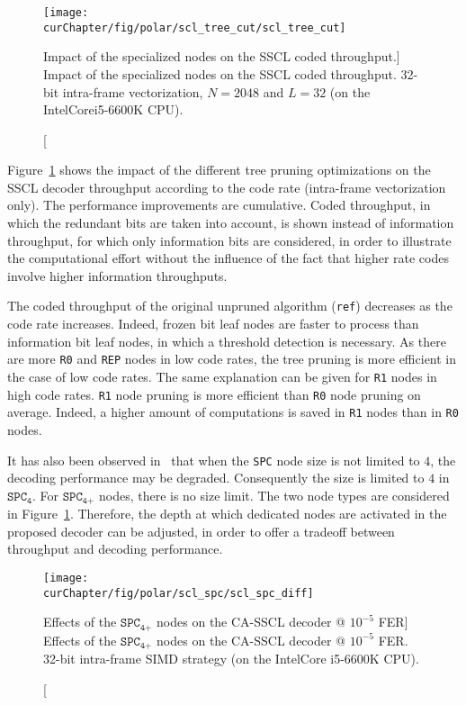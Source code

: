 \begin{figure}[htp]
  \centering
  \texttt{[image: \\curChapter/fig/polar/scl\_tree\_cut/scl\_tree\_cut]}
  \caption
    [Impact of the specialized nodes on the SSCL coded throughput.]
    {Impact of the specialized nodes on the SSCL coded throughput.
    32-bit intra-frame vectorization, $N=2048$ and $L=32$
    (on the Intel\R Core\TM i5-6600K CPU).}
  \label{plot:opt_polar_scl_tree_cut}
\end{figure}

Figure~\ref{plot:opt_polar_scl_tree_cut} shows the impact of the different tree
pruning optimizations on the SSCL decoder throughput according to the code
rate (intra-frame vectorization only). The performance improvements are
cumulative. Coded throughput, in which the redundant bits are taken into
account, is shown instead of information throughput, for which only information
bits are considered, in order to illustrate the computational effort without the
influence of the fact that higher rate codes involve higher information
throughputs.

The coded throughput of the original unpruned algorithm (\verb|ref|) decreases
as the code rate increases. Indeed, frozen bit leaf nodes are faster to process
than information bit leaf nodes, in which a threshold detection is necessary. As
there are more \verb|R0| and \verb|REP| nodes in low code rates, the tree
pruning is more efficient in the case of low code rates. The same explanation
can be given for \verb|R1| nodes in high code rates. \verb|R1| node pruning is
more efficient than \verb|R0| node pruning on average. Indeed, a higher amount
of computations is saved in \verb|R1| nodes than in \verb|R0| nodes.

It has also been observed in~\cite{Sarkis2016} that when the \verb|SPC| node
size is not limited to $4$, the decoding performance may be degraded.
Consequently the size is limited to $4$ in $\texttt{SPC}_\texttt{4}$. For
$\texttt{SPC}_\texttt{4+}$ nodes, there is no size limit. The two node types are
considered in Figure~\ref{plot:opt_polar_scl_tree_cut}. Therefore, the depth at
which dedicated nodes are activated in the proposed decoder can be adjusted, in
order to offer a tradeoff between throughput and decoding performance.

\begin{figure}[htp]
  \centering
  \texttt{[image: \\curChapter/fig/polar/scl\_spc/scl\_spc\_diff]}
  \caption
    [Effects of the $\texttt{SPC}_\texttt{4+}$ nodes on the CA-SSCL decoder @
     $10^{-5}$ FER]
    {Effects of the $\texttt{SPC}_\texttt{4+}$ nodes on the CA-SSCL decoder @
     $10^{-5}$ FER. 32-bit intra-frame SIMD strategy (on the Intel\R Core\TM
     i5-6600K CPU).}
  \label{plot:opt_polar_scl_spc}
\end{figure}

